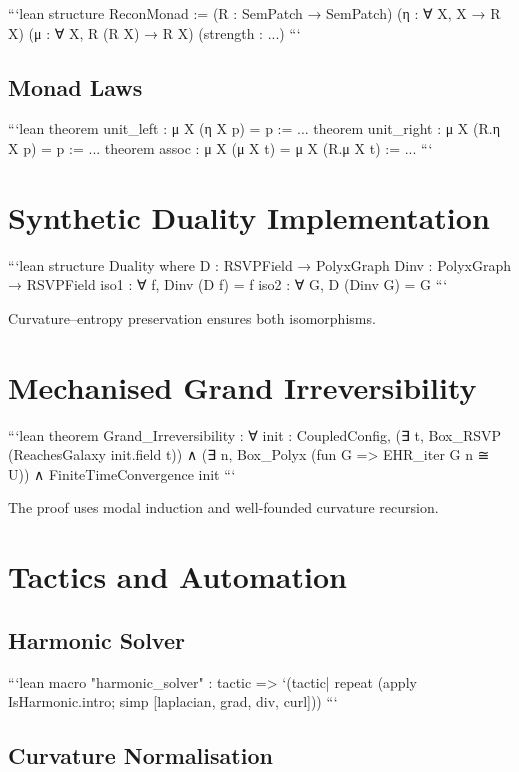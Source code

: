 ```lean
structure ReconMonad :=
  (R   : SemPatch → SemPatch)
  (η   : ∀ X, X → R X)
  (μ   : ∀ X, R (R X) → R X)
  (strength : ...)
```

\subsection{Monad Laws}

```lean
theorem unit_left  : μ X (η X p) = p := ...
theorem unit_right : μ X (R.η X p) = p := ...
theorem assoc      : μ X (μ X t) = μ X (R.μ X t) := ...
```

\section{Synthetic Duality Implementation}

```lean
structure Duality where
  D    : RSVPField → PolyxGraph
  Dinv : PolyxGraph → RSVPField
  iso1 : ∀ f, Dinv (D f) = f
  iso2 : ∀ G, D (Dinv G) = G
```

Curvature–entropy preservation ensures both isomorphisms.

\section{Mechanised Grand Irreversibility}

```lean
theorem Grand_Irreversibility :
  ∀ init : CoupledConfig,
    (∃ t, Box_RSVP (ReachesGalaxy init.field t)) ∧
    (∃ n, Box_Polyx (fun G => EHR_iter G n ≅ U)) ∧
    FiniteTimeConvergence init
```

The proof uses modal induction and well-founded curvature recursion.

\section{Tactics and Automation}

\subsection{Harmonic Solver}

```lean
macro "harmonic_solver" : tactic =>
  `(tactic|
      repeat
        (apply IsHarmonic.intro;
         simp [laplacian, grad, div, curl]))
```

\subsection{Curvature Normalisation}

